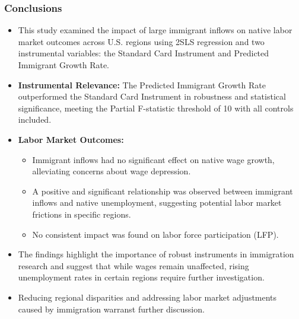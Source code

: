 \begin{frame}
    \frametitle{Conclusions}
        \begin{itemize}
            \item This study examined the impact of large immigrant inflows on native labor market outcomes across U.S. regions using 2SLS regression and two instrumental variables: the Standard Card Instrument and Predicted Immigrant Growth Rate.
            \item \textbf{Instrumental Relevance:} The Predicted Immigrant Growth Rate outperformed the Standard Card Instrument in robustness and statistical significance, meeting the Partial F-statistic threshold of 10 with all controls included.
            \item \textbf{Labor Market Outcomes:}
            \begin{itemize}
                \item Immigrant inflows had no significant effect on native wage growth, alleviating concerns about wage depression.
                \item A positive and significant relationship was observed between immigrant inflows and native unemployment, suggesting potential labor market frictions in specific regions.
                \item No consistent impact was found on labor force participation (LFP).
            \end{itemize}
            \item The findings highlight the importance of robust instruments in immigration research and suggest that while wages remain unaffected, rising unemployment rates in certain regions require further investigation.
            \item Reducing regional disparities and addressing labor market adjustments caused by immigration warranst further discussion.
        \end{itemize}
\end{frame}
